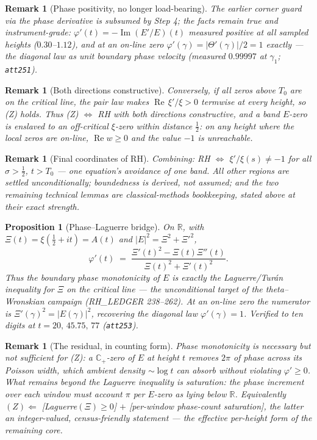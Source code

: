 \documentclass[11pt]{article}
\newtheorem{proposition}[theorem]{Proposition}
\newtheorem{remark}[theorem]{Remark}
\newcommand{\C}{\mathbb{C}}
\newcommand{\R}{\mathbb{R}}
\newcommand{\Hp}{\C_{+}}
\newcommand{\Th}{\Theta}
\begin{document}
\begin{remark}[Phase positivity, no longer load-bearing]
The earlier corner guard via the phase derivative is subsumed by Step 4; the
facts remain true and instrument-grade: $\varphi'(t)=-\operatorname{Im}
(E'/E)(t)$ measured positive at all sampled heights ($0.30$--$1.12$), and at
an on-line zero $\varphi'(\gamma)=|\Th'(\gamma)|/2=1$ \emph{exactly} --- the
diagonal law as unit boundary phase velocity (measured $0.99997$ at
$\gamma_1$; \texttt{att251}).
\end{remark}

\begin{remark}[Both directions constructive]
Conversely, if all zeros above $T_0$ are on the critical line, the pair law
makes $\operatorname{Re}\,\xi'/\xi>0$ termwise at every height, so (Z) holds.
Thus (Z) $\iff$ RH with both directions constructive, and a band $E$-zero is
enslaved to an off-critical $\xi$-zero within distance $\tfrac12$: on any
height where the local zeros are on-line, $\operatorname{Re}w\ge0$ and the
value $-1$ is unreachable.
\end{remark}

\begin{remark}[Final coordinates of RH]
Combining: \emph{RH $\iff$ $\xi'/\xi(s)\neq-1$ for all $\sigma>\tfrac12$,
$t>T_0$} --- one equation's avoidance of one band. All other regions are
settled unconditionally; boundedness is derived, not assumed; and the two
remaining technical lemmas are classical-methods bookkeeping, stated above at
their exact strength.
\end{remark}

\begin{proposition}[Phase--Laguerre bridge]\label{prop:bridge}
On $\R$, with $\Xi(t)=\xi(\tfrac12+it)=A(t)$ and $|E|^2=\Xi^2+\Xi'^2$,
\[ \varphi'(t)\;=\;\frac{\Xi'(t)^2-\Xi(t)\Xi''(t)}{\Xi(t)^2+\Xi'(t)^2}. \]
Thus the boundary phase monotonicity of $E$ is exactly the Laguerre/Tur\'an
inequality for $\Xi$ on the critical line --- the unconditional target of the
theta--Wronskian campaign (RH\_LEDGER 238--262). At an on-line zero the
numerator is $\Xi'(\gamma)^2=|E(\gamma)|^2$, recovering the diagonal law
$\varphi'(\gamma)=1$. Verified to ten digits at $t=20,\,45.75,\,77$
(\texttt{att253}).
\end{proposition}

\begin{remark}[The residual, in counting form]
Phase monotonicity is necessary but not sufficient for (Z): a $\Hp$-zero of
$E$ at height $t$ removes $2\pi$ of phase across its Poisson width, which
ambient density $\sim\log t$ can absorb without violating $\varphi'\ge0$.
What remains beyond the Laguerre inequality is \emph{saturation}: the phase
increment over each window must account $\pi$ per $E$-zero as lying below
$\R$. Equivalently $(Z)\Leftarrow$ [Laguerre$(\Xi)\ge0$] $+$ [per-window
phase-count saturation], the latter an integer-valued, census-friendly
statement --- the effective per-height form of the remaining core.
\end{remark}
\end{document}
